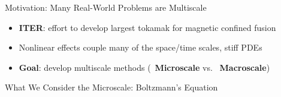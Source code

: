 \documentclass[final,hyperref={pdfpagelabels=false}]{beamer}
\newcommand{\inred}[1]
        {\mbox{\color{red} #1}}
\begin{document}
\begin{frame}[t]
\begin{columns}[t]
\begin{column}{.31\textwidth}
\begin{block}{Motivation: Many Real-World Problems are Multiscale}
\vspace{-3mm}

\begin{itemize}
\item {\bf ITER}: effort to develop largest tokamak for magnetic confined fusion
\item Nonlinear effects couple many of the space/time scales,
	stiff PDEs
\item {\bf Goal}: develop multiscale methods (\inred{\bf Microscale} vs. \inred{\bf Macroscale})
\end{itemize}

\end{block}

\begin{block}{What We Consider the Microscale: Boltzmann's Equation}


\end{block}
\end{column}
\end{columns}
\end{frame}
\end{document}
